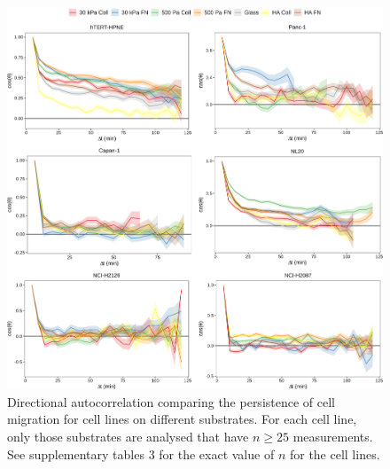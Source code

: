 \documentclass[11pt,letterpaper,english,oneside]{article} %
\begin{document}
\begin{figure}[H]
    \hspace*{-0.8cm}
    \centering
    \includegraphics{../Figures/Supplementary_Figures17_21/supplementary_figure19.png}
    \caption{Directional autocorrelation comparing the persistence of cell migration for cell lines on different substrates.
    For each cell line, only those substrates are analysed that have $n \geq 25$ measurements.
    See supplementary tables 3 for the exact value of $n$ for the cell lines.}
    \label{fig:fig19}
\end{figure}
\end{document}
